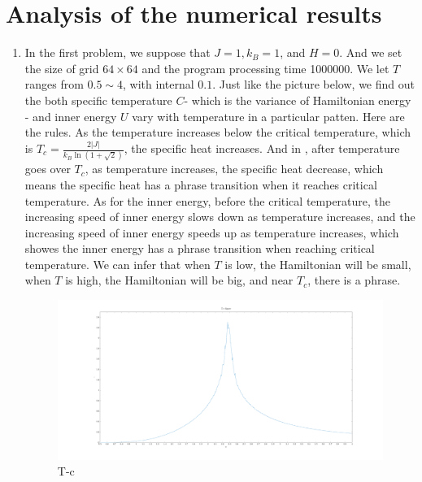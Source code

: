 \documentclass[11pt,openany]{book}              %
\begin{document}
\section{Analysis of the numerical results}
\begin{enumerate}
  \item In the first problem, we suppose that $J = 1, k_B = 1$, and $H = 0$. 
    And we set the size of grid \(64 \times 64\) and the program processing time 1000000.
    We let \(T\) ranges from \(0.5\sim 4\), with internal \(0.1\).
    Just like the picture  below, we find out the both specific temperature \(C\)- which is the variance of Hamiltonian energy -  and inner energy \(U\) vary with temperature in a particular patten. Here are the rules.
    As the temperature increases below the critical temperature, which is $T_c =\frac{2 |J|}{k_B \ln ( 1+\sqrt{2})} $, the specific heat increases.
    And in , after temperature goes over \(T_c\), as temperature increases, the specific heat decrease, which means the specific heat has a phrase transition when it reaches critical temperature.
    As for the inner energy, before the critical temperature, the increasing speed of inner energy slows down as temperature increases, and the increasing speed of inner energy speeds up as temperature increases, which showes the inner energy has a phrase transition when reaching critical temperature.
  We can infer that when \(T\) is low, the Hamiltonian will be small, when \(T\) is high, the Hamiltonian will be big, and near \(T_c\), there is a phrase.   
	\begin{figure}\label{fig:Tc}
		\centering
		\includegraphics[width=0.8\linewidth]{Tc.pdf}
		\caption{T-c}
	\end{figure}
  

\end{enumerate}
\end{document}
